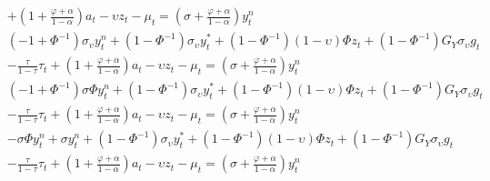 \begin{align}
        &+ \left(1 + \frac{\varphi + \alpha}{1-\alpha}\right)a_t - \upsilon z_t -\mu_t = \left(\sigma + \frac{\varphi + \alpha}{1-\alpha}\right)y^n_t\\
    &(- 1 + \Phi^{-1})\sigma_\upsilon y^n_t +(1 - \Phi^{-1}) \sigma_\upsilon y^*_t + (1 - \Phi^{-1}) (1-\upsilon)\Phi z_t + (1 - \Phi^{-1}) G_Y \sigma_\upsilon g_t \nonumber \\
        &- \frac{\tau}{1-\tau}\tau_t  + \left(1 + \frac{\varphi + \alpha}{1-\alpha}\right)a_t - \upsilon z_t -\mu_t = \left(\sigma + \frac{\varphi + \alpha}{1-\alpha}\right)y^n_t\\
    &(- 1 + \Phi^{-1})\sigma \Phi y^n_t +(1 - \Phi^{-1}) \sigma_\upsilon y^*_t + (1 - \Phi^{-1}) (1-\upsilon)\Phi z_t + (1 - \Phi^{-1}) G_Y \sigma_\upsilon g_t \nonumber \\
        &- \frac{\tau}{1-\tau}\tau_t  + \left(1 + \frac{\varphi + \alpha}{1-\alpha}\right)a_t - \upsilon z_t -\mu_t = \left(\sigma + \frac{\varphi + \alpha}{1-\alpha}\right)y^n_t\\
    &-\sigma \Phi y^n_t + \sigma y^n_t +(1 - \Phi^{-1}) \sigma_\upsilon y^*_t + (1 - \Phi^{-1}) (1-\upsilon)\Phi z_t + (1 - \Phi^{-1}) G_Y \sigma_\upsilon g_t \nonumber \\
        &- \frac{\tau}{1-\tau}\tau_t  + \left(1 + \frac{\varphi + \alpha}{1-\alpha}\right)a_t - \upsilon z_t -\mu_t = \left(\sigma + \frac{\varphi + \alpha}{1-\alpha}\right)y^n_t
\end{align}
